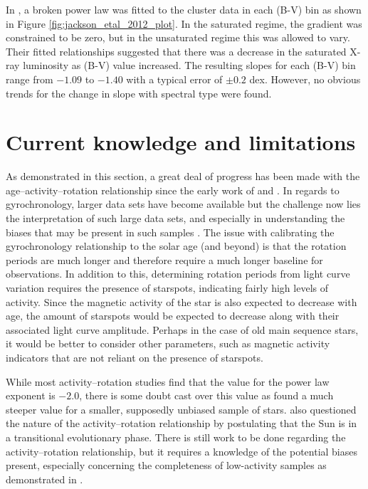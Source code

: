 In \citet{Jackson_etal_2012}, a broken power law was fitted to the cluster data in each (B-V) bin as shown in Figure \ref{fig:jackson_etal_2012_plot}. In the saturated regime, the gradient was constrained to be zero, but in the unsaturated regime this was allowed to vary. Their fitted relationships suggested that there was a decrease in the saturated X-ray luminosity as (B-V) value increased. The resulting slopes for each (B-V) bin range from $-1.09$ to $-1.40$ with a typical error of $\pm 0.2$ dex. However, no obvious trends for the change in slope with spectral type were found.

\section{Current knowledge and limitations}
As demonstrated in this section, a great deal of progress has been made with the age--activity--rotation relationship since the early work of \citet{Kraft_1967} and \citet{Skumanich_1972}. In regards to gyrochronology, larger data sets have become available but the challenge now lies the interpretation of such large data sets, and especially in understanding the biases that may be present in such samples \citep{van_Saders_etal_2019}. The issue with calibrating the gyrochronology relationship to the solar age (and beyond) is that the rotation periods are much longer and therefore require a much longer baseline for observations. In addition to this, determining rotation periods from light curve variation requires the presence of starspots, indicating fairly high levels of activity. Since the magnetic activity of the star is also expected to decrease with age, the amount of starspots would be expected to decrease along with their associated light curve amplitude. Perhaps in the case of old main sequence stars, it would be better to consider other parameters, such as magnetic activity indicators that are not reliant on the presence of starspots.

While most activity--rotation studies find that the value for the power law exponent is $-2.0$, there is some doubt cast over this value as \citet{Wright_etal_2011} found a much steeper value for a smaller, supposedly unbiased sample of stars. \citet{Metcalfe_etal_2016} also questioned the nature of the activity--rotation relationship by postulating that the Sun is in a transitional evolutionary phase. There is still work to be done regarding the activity--rotation relationship, but it requires a knowledge of the potential biases present, especially concerning the completeness of low-activity samples as demonstrated in \citet{Wright_etal_2011}.

